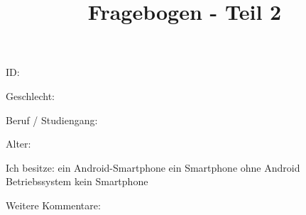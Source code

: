 \documentclass[10pt,a4paper]{scrartcl}
\title{Fragebogen - Teil 2}
\date{\vspace{-5ex}}
\begin{document}
\maketitle
\pagestyle{empty}

\vspace{2 cm}

ID: \dotfill\\

\vspace{2 cm}

Geschlecht: \dotfill\\

\vspace{2 cm}

Beruf / Studiengang: \dotfill\\

\vspace{2 cm}

Alter: \dotfill\\

\vspace{2 cm}

Ich besitze: \textbigcircle \hspace{0.1cm} ein Android-Smartphone \textbigcircle \hspace{0.1cm} ein Smartphone ohne Android Betriebssystem \textbigcircle \hspace{0.1cm} kein Smartphone

\vspace{2 cm}

Weitere Kommentare: \dotfill\\
\end{document}
